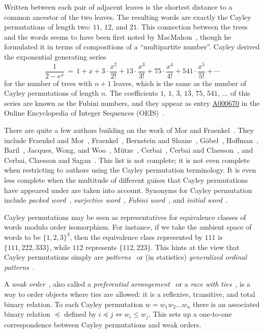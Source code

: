 \documentclass[a4paper, 11pt]{article}
\theoremstyle{definition}
\begin{document}
Written between each pair of adjacent leaves is the shortest
distance to a common ancestor of the two leaves. The resulting words are
exactly the Cayley permutations of length two: $11$, $12$, and
$21$. This connection between the trees and the words seems to have been first noted
by MacMahon~\cite{MacMahon1890}, though he formulated it in terms of
compositions of a ``multipartite number''.
Cayley derived the exponential generating series
\[
  \frac{1}{2-e^x} \,=\,
    1 + x + 3\cdot\frac{x^2}{2!} + 13\cdot\frac{x^3}{3!}
    + 75\cdot\frac{x^4}{4!} + 541\cdot\frac{x^5}{5!} + \cdots
\]
for the number of trees with $n+1$ leaves, which is the same as the number
of Cayley permutations of length $n$. The coefficients $1$, $1$,
$3$, $13$, $75$, $541$, $\dots$ of this series are known as the Fubini
numbers, and they appear as entry \href{https://oeis.org/A000670}{A000670}
in the Online Encyclopedia of Integer Sequences (OEIS)~\cite{oeis}.

There are quite a few authors building on the work of Mor and
Fraenkel~\cite{MorFraenkel1984}. They include
Fraenkel and Mor~\cite{FM1983},
Fraenkel~\cite{Fraenkel1985},
Bernstein and Sloane~\cite{BS1995},
Göbel~\cite{Gobel1997},
Hoffman~\cite{Hoffman2001, Hoffman2016},
Baril~\cite{Baril2003},
Jacques, Wong, and Woo~\cite{Jacques-etal},
M\"utze~\cite{Mutze2023},
Cerbai~\cite{sortcay,modasc,modasc2},
Cerbai and Claesson~\cite{CC:fish, CC:tpb, CC:caypol},
and Cerbai, Claesson and Sagan~\cite{modasc3}.
This list is not complete; it is not even complete when restricting to
authors using the Cayley permutation terminology. It is even less
complete when the multitude of different guises that Cayley permutations have
appeared under are taken into account. Synonyms for Cayley permutation include
\emph{packed word}~\cite{FNJ2014, KR2022, Marberg2020, Marberg2021},
\emph{surjective word}~\cite{Hazewinkel2008},
\emph{Fubini word}~\cite{BilleyRyan, Rhoades2022, Wilson2018}, and
\emph{initial word}~\cite{PP2016}.

Cayley permutations may be seen as representatives for equivalence
classes of words modulo order isomorphism. For instance, if we take the
ambient space of words to be $\{1,2,3\}^3$, then the equivalence class
represented by $111$ is $\{111,222,333\}$, while $112$ represents $\{112, 223\}$.
This hints at the view that Cayley permutations simply are \emph{patterns}~\cite{Savage2006}
or (in statistics) \emph{generalized ordinal patterns}~\cite{SF2022}.

A \emph{weak order}~\cite{Bailey1998, Birmajer-etal, HH2013, Jacques-etal},
also called a
\emph{preferential arrangement}~\cite{AUP2013, BZG2016, Gross1962, NBCC2020, Pippenger2010}
or a \emph{race with ties}~\cite{Mendelson1982},
is a way to order
objects where ties are allowed: it is a reflexive, transitive, and
total binary relation. To each Cayley permutation $w=w_1w_2\ldots w_n$
there is an associated binary relation $\preceq$ defined by
$i\preceq j\Leftrightarrow w_i\leq w_j$. This sets up a one-to-one
correspondence between Cayley permutations and weak orders.
\end{document}
